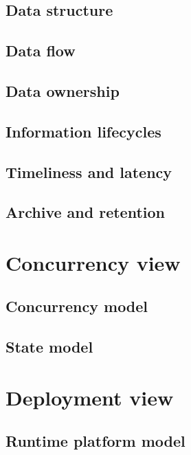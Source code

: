 \documentclass[a4paper,11pt]{report}
\begin{document}
\subsection{Data structure}
\label{sec:data-structure}


\subsection{Data flow}
\label{sec:data-flow}


\subsection{Data ownership}
\label{sec:data-ownership}


\subsection{Information lifecycles}
\label{sec:inform-lifecycl}


\subsection{Timeliness and latency}
\label{sec:timeliness-latency}


\subsection{Archive and retention}
\label{sec:archive-retention}


\section{Concurrency view}
\label{sec:concurrency-view}


\subsection{Concurrency model}
\label{sec:concurrency-model}


\subsection{State model}
\label{sec:state-model}


\section{Deployment view}
\label{sec:deployment-view}


\subsection{Runtime platform model}
\label{sec:runt-platf-model}
\end{document}
